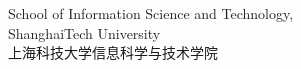 \thispagestyle{titlepage}
\setcounter{page}{\value{page}}
\renewcommand{\thepage}{\roman{page}}

\makeatletter

\vspace{2cm}

\begin{flushleft}
  \Huge\bf
  \@title\\
  \@titleZh
\end{flushleft}

\vspace{2.5cm}

{
  \large
  \@studentNameEn\\
  \@studentNameZh
}

\vspace{1.25cm}

School of Information Science and Technology,\\
ShanghaiTech University\\
上海科技大学信息科学与技术学院

\makeatother

\cleardoublepage
